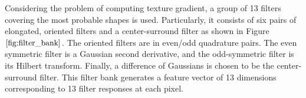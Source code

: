 \documentclass{SMBV12}
\begin{document}
\begin{figure}[htbp]
    \centering
    \caption{  } 
\end{figure}

Considering the problem of computing texture gradient, a group of 13 filters covering the most probable shapes is used. Particularly, it consists of six pairs of elongated, oriented filters and a center-surround filter as shown in Figure $\ref{fig:filter_bank}$. The oriented filters are in even/odd quadrature pairs. The even symmetric filter is a Gaussian second derivative, and the odd-symmetric filter is its Hilbert transform. Finally, a difference of Gaussians is chosen to be the center-surround filter. This filter bank generates a feature vector of 13 dimensions corresponding to 13 filter responses at each pixel.
\end{document}
